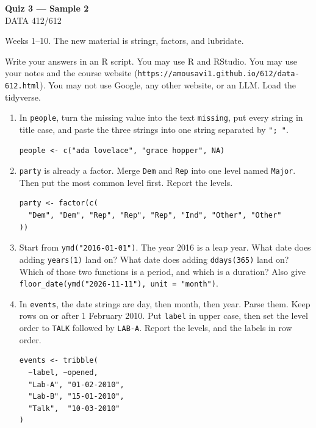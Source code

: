 \documentclass[11pt]{article}
\begin{document}
\begin{center}
{\LARGE\bfseries Quiz 3 --- Sample 2}\\[0.35em]
DATA 412/612
\end{center}

\vspace{0.25em}

Weeks 1--10. The new material is stringr, factors, and lubridate.

Write your answers in an R script. You may use R and RStudio.
You may use your notes and the course website
(\texttt{https://amousavi1.github.io/612/data-612.html}).
You may not use Google, any other website, or an LLM.
Load the tidyverse.

\begin{enumerate}
\item In \texttt{people}, turn the missing value into the text
\texttt{missing}, put every string in title case, and paste the
three strings into one string separated by \texttt{"; "}.

\begin{lstlisting}
people <- c("ada lovelace", "grace hopper", NA)
\end{lstlisting}

\item \texttt{party} is already a factor. Merge \texttt{Dem} and
\texttt{Rep} into one level named \texttt{Major}. Then put the
most common level first. Report the levels.

\begin{lstlisting}
party <- factor(c(
  "Dem", "Dem", "Rep", "Rep", "Rep", "Ind", "Other", "Other"
))
\end{lstlisting}

\item Start from \texttt{ymd("2016-01-01")}. The year 2016 is a
leap year. What date does adding \texttt{years(1)} land on?
What date does adding \texttt{ddays(365)} land on?
Which of those two functions is a period, and which is a duration?
Also give \texttt{floor\_date(ymd("2026-11-11"), unit = "month")}.

\item In \texttt{events}, the date strings are day, then month,
then year. Parse them. Keep rows on or after 1 February 2010.
Put \texttt{label} in upper case, then set the level order to
\texttt{TALK} followed by \texttt{LAB-A}. Report the levels, and
the labels in row order.

\begin{lstlisting}
events <- tribble(
  ~label, ~opened,
  "Lab-A", "01-02-2010",
  "Lab-B", "15-01-2010",
  "Talk",  "10-03-2010"
)
\end{lstlisting}
\end{enumerate}
\end{document}
